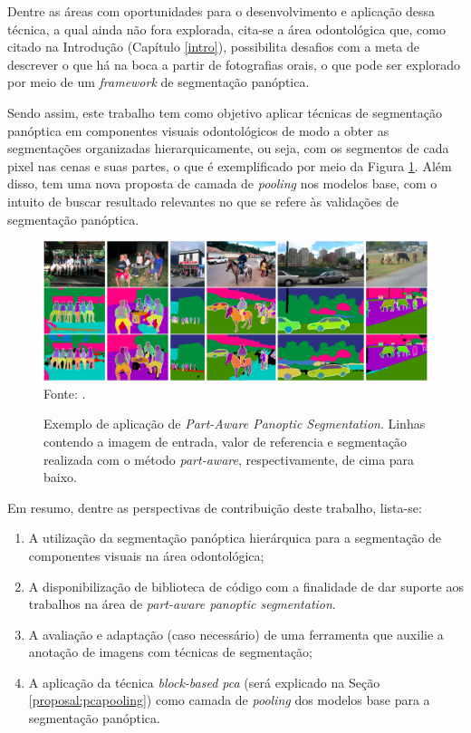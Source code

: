 Dentre as áreas com oportunidades para o desenvolvimento e aplicação dessa técnica, a qual ainda não fora explorada, cita-se a área odontológica que, como citado na Introdução (Capítulo \ref{intro}), possibilita desafios com a meta de descrever o que há na boca a partir de fotografias orais, o que pode ser explorado por meio de um \textit{framework} de segmentação panóptica.

Sendo assim, este trabalho tem como objetivo aplicar técnicas de segmentação panóptica em componentes visuais odontológicos de modo a obter as segmentações organizadas hierarquicamente, ou seja, com os segmentos de cada pixel nas cenas e suas partes, o que é exemplificado por meio da Figura \ref{proposal:proposal:fig:3}. Além disso, tem uma nova proposta de camada de \textit{pooling} nos modelos base, com o intuito de buscar resultado relevantes no que se refere às validações de segmentação panóptica.

\begin{figure}[H]
    \centering
    \caption{Exemplo de aplicação de \textit{Part-Aware Panoptic Segmentation}. Linhas contendo a imagem de entrada, valor de referencia e segmentação realizada com o método \textit{part-aware}, respectivamente, de cima para baixo.}
    \includegraphics[width=1\linewidth]{recursos/imagens/proposal/part-aware-example.png}
    \label{proposal:proposal:fig:3}
    Fonte: \cite{DeGeus2021}.
\end{figure}

Em resumo, dentre as perspectivas de contribuição deste trabalho, lista-se:

\begin{enumerate}[I]
  \item A utilização da segmentação panóptica hierárquica para a segmentação de componentes visuais na área odontológica;
  \item A disponibilização de biblioteca de código com a finalidade de dar suporte aos trabalhos na área de \textit{part-aware panoptic segmentation}.
  \item A avaliação e adaptação (caso necessário) de uma ferramenta que auxilie a anotação de imagens com técnicas de segmentação;
  \item A aplicação da técnica \textit{block-based pca} \cite{Salvadeo2011} (será explicado na Seção \ref{proposal:pcapooling}) como camada de \textit{pooling} dos modelos base para a segmentação panóptica.
\end{enumerate}

